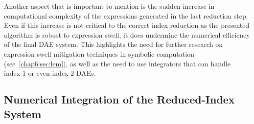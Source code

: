 Another aspect that is important to mention is the sudden increase in computational complexity of the expressions generated in the last reduction step. Even if this increase is not critical to the correct index reduction as the presented algorithm is robust to expression swell, it does undermine the numerical efficiency of the final \ac{DAE} system. This highlights the need for further research on expression swell mitigation techniques in symbolic computation (see~\ref{chap6:sec:lem}), as well as the need to use integrators that can handle index-1 or even index-2 \acp{DAE}.

%

\subsection{Numerical Integration of the Reduced-Index System}
\label{chap6:sec:numerical_integration}

